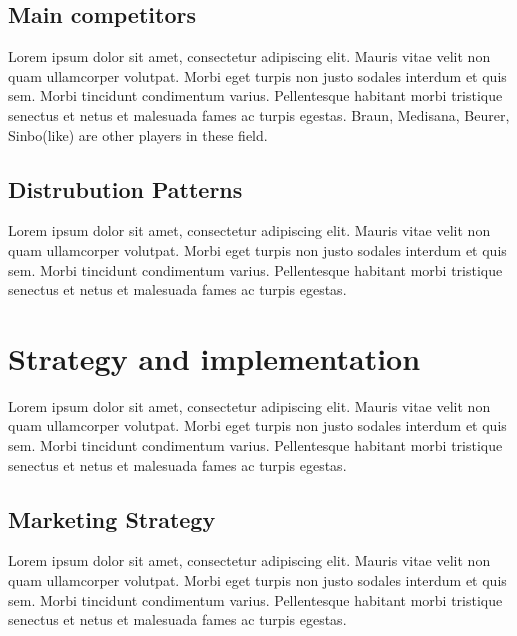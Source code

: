 \documentclass[11pt,titlepage]{article}
\begin{document}
\subsection{Main competitors}
Lorem ipsum dolor sit amet, consectetur adipiscing elit. Mauris vitae velit 
non quam ullamcorper volutpat. Morbi eget turpis non justo sodales interdum 
et quis sem. Morbi tincidunt condimentum varius. Pellentesque habitant morbi 
tristique senectus et netus et malesuada fames ac turpis egestas.\newline
Braun, Medisana, Beurer, Sinbo(like) are other players in these field.

\subsection{Distrubution Patterns}
Lorem ipsum dolor sit amet, consectetur adipiscing elit. Mauris vitae velit 
non quam ullamcorper volutpat. Morbi eget turpis non justo sodales interdum 
et quis sem. Morbi tincidunt condimentum varius. Pellentesque habitant morbi 
tristique senectus et netus et malesuada fames ac turpis egestas.\newline
\pagebreak

\section{Strategy and implementation}
Lorem ipsum dolor sit amet, consectetur adipiscing elit. Mauris vitae velit 
non quam ullamcorper volutpat. Morbi eget turpis non justo sodales interdum 
et quis sem. Morbi tincidunt condimentum varius. Pellentesque habitant morbi 
tristique senectus et netus et malesuada fames ac turpis egestas.\newline

\subsection{Marketing Strategy}
Lorem ipsum dolor sit amet, consectetur adipiscing elit. Mauris vitae velit 
non quam ullamcorper volutpat. Morbi eget turpis non justo sodales interdum 
et quis sem. Morbi tincidunt condimentum varius. Pellentesque habitant morbi 
tristique senectus et netus et malesuada fames ac turpis egestas.\newline
\end{document}
